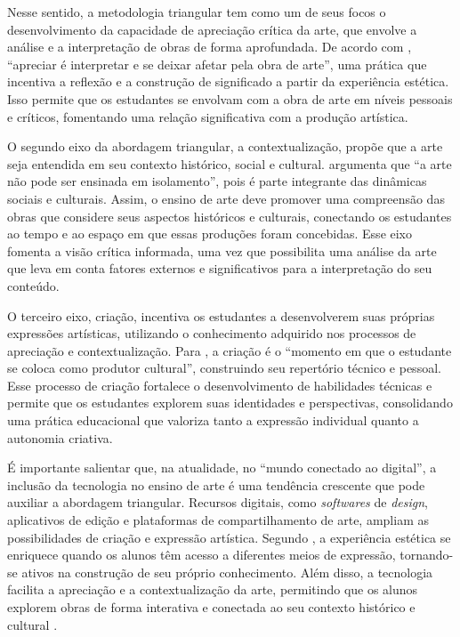 \documentclass[portuguese]{textolivre}
\begin{document}
Nesse sentido, a metodologia triangular tem como um de seus focos o desenvolvimento da capacidade de apreciação crítica da arte, que envolve a análise e a interpretação de obras de forma aprofundada. De acordo com \textcite{barbosa2010arte}, “apreciar é interpretar e se deixar afetar pela obra de arte”, uma prática que incentiva a reflexão e a construção de significado a partir da experiência estética. Isso permite que os estudantes se envolvam com a obra de arte em níveis pessoais e críticos, fomentando uma relação significativa com a produção artística.

O segundo eixo da abordagem triangular, a contextualização, propõe que a arte seja entendida em seu contexto histórico, social e cultural. \textcite{barbosa2008educacao} argumenta que “a arte não pode ser ensinada em isolamento”, pois é parte integrante das dinâmicas sociais e culturais. Assim, o ensino de arte deve promover uma compreensão das obras que considere seus aspectos históricos e culturais, conectando os estudantes ao tempo e ao espaço em que essas produções foram concebidas. Esse eixo fomenta a visão crítica informada, uma vez que possibilita uma análise da arte que leva em conta fatores externos e significativos para a interpretação do seu conteúdo.

O terceiro eixo, criação, incentiva os estudantes a desenvolverem suas próprias expressões artísticas, utilizando o conhecimento adquirido nos processos de apreciação e contextualização. Para \textcite{barbosa2009arte}, a criação é o “momento em que o estudante se coloca como produtor cultural”, construindo seu repertório técnico e pessoal. Esse processo de criação fortalece o desenvolvimento de habilidades técnicas e permite que os estudantes explorem suas identidades e perspectivas, consolidando uma prática educacional que valoriza tanto a expressão individual quanto a autonomia criativa.

É importante salientar que, na atualidade, no “mundo conectado ao digital”, a inclusão da tecnologia no ensino de arte é uma tendência crescente que pode auxiliar a abordagem triangular. Recursos digitais, como \textit{softwares} de \textit{design}, aplicativos de edição e plataformas de compartilhamento de arte, ampliam as possibilidades de criação e expressão artística. Segundo \textcite{dewey1934art}, a experiência estética se enriquece quando os alunos têm acesso a diferentes meios de expressão, tornando-se ativos na construção de seu próprio conhecimento. Além disso, a tecnologia facilita a apreciação e a contextualização da arte, permitindo que os alunos explorem obras de forma interativa e conectada ao seu contexto histórico e cultural \cite{freire1996aautonomia}.
\end{document}
